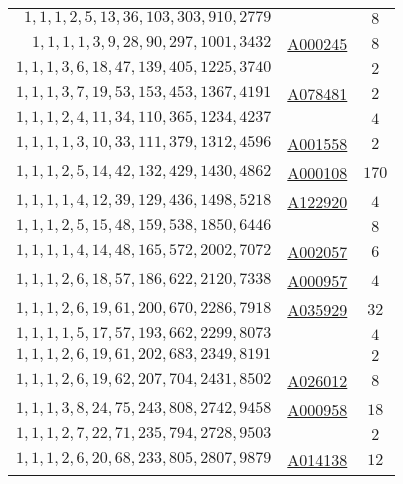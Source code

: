 \begin{longtabu}{|r|l|c|}
    \(    1,    1,    1,    2,    5,   13,   36,  103,  303,  910, 2779\) &	 & \(8\)\\
    \(    1,    1,    1,    1,    3,    9,   28,   90,  297, 1001, 3432\) &	\href{http://oeis.org/A000245}{A000245} & \(8\)\\
    \(    1,    1,    1,    3,    6,   18,   47,  139,  405, 1225, 3740\) &  & \(2\)\\
    \(    1,    1,    1,    3,    7,   19,   53,  153,  453, 1367, 4191\) & \href{http://oeis.org/A078481}{A078481} & \(2\)\\
    \(    1,    1,    1,    2,    4,   11,   34,  110,  365, 1234, 4237\) & 	& \(4\)\\
    \(    1,    1,    1,    1,    3,   10,   33,  111,  379, 1312, 4596\) &	\href{http://oeis.org/A001558}{A001558} & \(2\)\\
    \(    1,    1,    1,    2,    5,   14,   42,  132,  429, 1430, 4862\) &	\href{http://oeis.org/A000108}{A000108} & \(170\)\\
    \(    1,    1,    1,    1,    4,   12,   39,  129,  436, 1498, 5218\) &	\href{http://oeis.org/A122920}{A122920} & \(4\)\\
    \(    1,    1,    1,    2,    5,   15,   48,  159,  538, 1850, 6446\) & 	& \(8\)\\
    \(    1,    1,    1,    1,    4,   14,   48,  165,  572, 2002, 7072\) &	\href{http://oeis.org/A002057}{A002057} & \(6\)\\
    \(    1,    1,    1,    2,    6,   18,   57,  186,  622, 2120, 7338\) &	\href{http://oeis.org/A000957}{A000957} & \(4\)\\
    \(    1,    1,    1,    2,    6,   19,   61,  200,  670, 2286, 7918\) &	\href{http://oeis.org/A035929}{A035929} & \(32\)\\
    \(    1,    1,    1,    1,    5,   17,   57,  193,  662, 2299, 8073\) & 	& \(4\)\\
    \(    1,    1,    1,    2,    6,   19,   61,  202,  683, 2349, 8191\) &	 & \(2\)\\
    \(    1,    1,    1,    2,    6,   19,   62,  207,  704, 2431, 8502\) &	\href{http://oeis.org/A026012}{A026012} & \(8\)\\
    \(    1,    1,    1,    3,    8,   24,   75,  243,  808, 2742, 9458\) &	\href{http://oeis.org/A000958}{A000958} & \(18\)\\
    \(    1,    1,    1,    2,    7,   22,   71,  235,  794, 2728, 9503\) &	 & \(2\)\\
    \(    1,    1,    1,    2,    6,   20,   68,  233,  805, 2807, 9879\) & \href{http://oeis.org/A014138}{A014138} & \(12\)\\

\end{longtabu}
